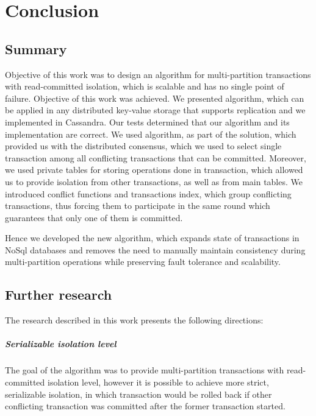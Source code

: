 
\chapter{Conclusion}\label{chapter:summary}

\section{Summary}
Objective of this work was to design an algorithm for multi-partition transactions with read-committed isolation, which is scalable and has no single point of failure. Objective of this work was achieved. We presented \mpt algorithm, which can be applied in any distributed key-value storage that supports replication and we implemented \mpt in Cassandra. Our tests determined that our algorithm and its implementation are correct. We used \paxos algorithm, as part of the solution, which provided us with the distributed consensus, which we used to select single transaction among all conflicting transactions that can be committed. Moreover, we used private tables for storing operations done in transaction, which allowed us to provide isolation from other transactions, as well as from main tables. We introduced conflict functions and transactions index, which group conflicting transactions, thus forcing them to participate in the same \paxos round which guarantees that only one of them is committed.

Hence we developed the new algorithm, which expands state of transactions in NoSql databases and 
removes the need to manually maintain consistency during multi-partition operations 
while preserving fault tolerance and scalability. 


\section{Further research}
The research described in this work presents the following directions:

\paragraph{Serializable isolation level}
The goal of the algorithm was to provide multi-partition transactions with read-committed isolation level, however it is possible to achieve more strict, serializable isolation, in which transaction would be rolled back if other conflicting transaction was committed after the former transaction started. 

